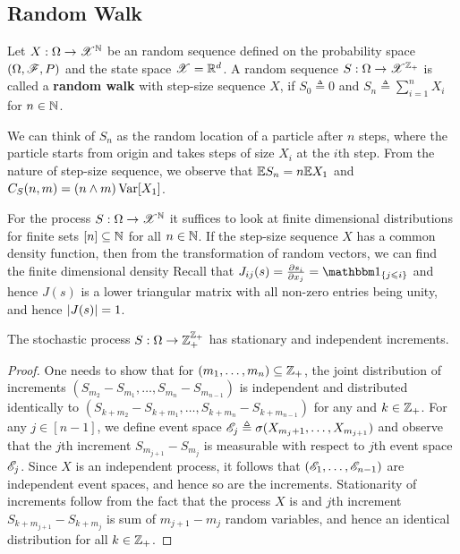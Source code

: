 \documentclass[letterpaper,10pt,english]{article}
\begin{document}
\subsection{Random Walk}
\begin{defn}
Let $X: \Omega \to \mathscr{X}^{\mathbb{N}}$ be an \iid random sequence defined on the probability space $(\Omega, \mathscr{F}, P)$ and the state space $\mathscr{X} = \mathbb{R}^d$. 
A random sequence $S: \Omega \to \mathscr{X}^{\mathbb{Z}_+}$ is called a \textbf{random walk} with step-size sequence $X$, 
if $S_0 \triangleq 0$ and $S_n \triangleq \sum_{i=1}^nX_i$ for $n \in \mathbb{N}$. 
\end{defn}
\begin{rem}
We can think of $S_n$ as the random location of a particle after $n$ steps, 
where the particle starts from origin and takes steps of size $X_i$ at the $i$th step. 
From the \iid nature of step-size sequence, 
we observe that $\mathbb{E} S_n = n\mathbb{E} X_1$ and $C_S(n,m) = (n\wedge m)\operatorname{Var}[X_1]$.
\end{rem}
\begin{rem} 
For the process $S: \Omega \to \mathscr{X}^{\mathbb{N}}$ it suffices to look at finite dimensional distributions for finite sets $[n] \subseteq \mathbb{N}$ for all $n \in \mathbb{N}$. 
If the \iid step-size sequence $X$ has a common density function, 
then from the transformation of random vectors, 
we can find the finite dimensional density 
Recall that $J_{ij}(s) = \frac{\partial s_i}{\partial x_j} = \SetIn{j \le i}$ and hence $J(s)$ is a lower triangular matrix with all non-zero entries being unity, and hence $\left\lvert J(s)\right\rvert = 1$.
\end{rem}
\begin{thm} 
The stochastic process $S: \Omega \to \mathbb{Z}_+^{\mathbb{Z}_+}$ has stationary and independent increments.
\end{thm}
\begin{proof}
One needs to show that for $(m_1, \dots, m_n) \subseteq \mathbb{Z}_+$, 
the joint distribution of increments $(S_{m_2}-S_{m_1}, \dots, S_{m_n}-S_{m_{n-1}})$ is independent and distributed identically to $(S_{k+m_2}-S_{k+m_1}, \dots, S_{k+m_n}-S_{k+m_{n-1}})$ for any and $k \in \mathbb{Z}_+$.  
For any $j \in [n-1]$, 
we define event space $\mathscr{E}_j \triangleq \sigma(X_{m_j+1}, \dots, X_{m_{j+1}})$ and observe that the $j$th increment $S_{m_{j+1}}-S_{m_j}$ is measurable with respect to $j$th event space $\mathscr{E}_j$. 
Since $X$ is an independent process, it follows that $(\mathscr{E}_1, \dots, \mathscr{E}_{n-1})$ are independent event spaces, and hence so are the increments. 
Stationarity of increments follow from the fact that the process $X$ is \iid and $j$th increment $S_{k+m_{j+1}}-S_{k+m_j}$ is sum of $m_{j+1}-m_j$ \iid random variables, and hence an identical distribution for all $k \in \mathbb{Z}_+$. 
\end{proof}
\end{document}

